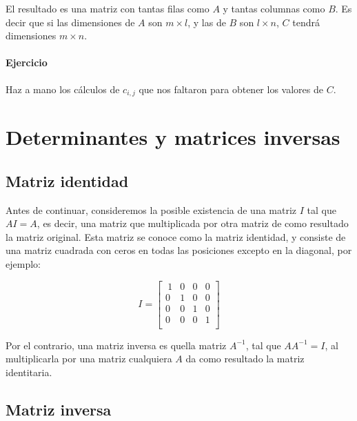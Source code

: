 \documentclass[
]{book}
\begin{document}
El resultado es una matriz con tantas filas como \(A\) y tantas columnas como \(B\). Es decir que si las dimensiones de \(A\) son \(m \times l\), y las de \(B\) son \(l \times n\), \(C\) tendrá dimensiones \(m \times n\).

\hypertarget{ejercicio-2}{%
\paragraph{Ejercicio}\label{ejercicio-2}}

Haz a mano los cálculos de \(c_{i, j}\) que nos faltaron para obtener los valores de \(C\).

\hypertarget{determinantes-y-matrices-inversas}{%
\section{Determinantes y matrices inversas}\label{determinantes-y-matrices-inversas}}

\hypertarget{matriz-identidad}{%
\subsection{Matriz identidad}\label{matriz-identidad}}

Antes de continuar, consideremos la posible existencia de una matriz \(I\) tal que \(A I = A\), es decir, una matriz que multiplicada por otra matriz de como resultado la matriz original. Esta matriz se conoce como la matriz identidad, y consiste de una matriz cuadrada con ceros en todas las posiciones excepto en la diagonal, por ejemplo:

\begin{equation}
I = \left[ 
\begin{array}{ccc}
\ 1 & 0 & 0 & 0 \\
  0 & 1 & 0 & 0 \\
  0 & 0 & 1 & 0 \\
  0 & 0 & 0 & 1 \\
\end{array}
\right]
\end{equation}

Por el contrario, una matriz inversa es quella matriz \(A^{-1}\), tal que \(AA^{-1} = I\), al multiplicarla por una matriz cualquiera \(A\) da como resultado la matriz identitaria.

\hypertarget{matriz-inversa}{%
\subsection{Matriz inversa}\label{matriz-inversa}}
\end{document}
